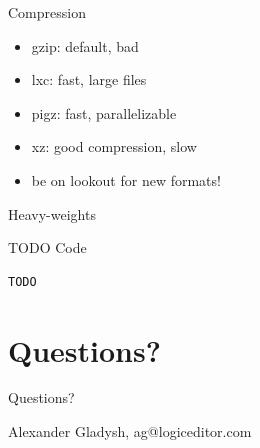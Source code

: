 \documentclass[handout]{beamer}
\begin{document}

\begin{frame}{Compression}

\begin{itemize}
\item gzip: default, bad
\item lxc: fast, large files
\item pigz: fast, parallelizable
\item xz: good compression, slow
\item be on lookout for new formats!
\end{itemize}

\end{frame}


\begin{frame}

\Huge{Heavy-weights}

\end{frame}


\begin{frame}[fragile]{TODO Code}

\begin{verbatim}
TODO
\end{verbatim}

\end{frame}


\section{Questions?}


\begin{frame}{Questions?}

Alexander Gladysh,
ag@logiceditor.com

\end{frame}

\end{document}
